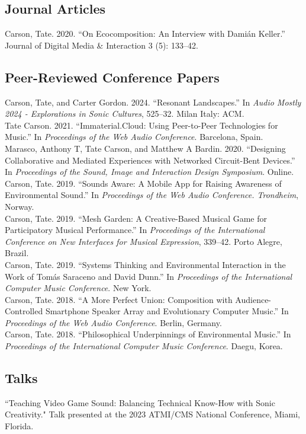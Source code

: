 \documentclass[12pt, a4paper]{article}
\newcommand{\years}[1]{\marginnote{\scriptsize #1}}
\begin{document}
\subsection*{Journal Articles}
\noindent
\years{2020} Carson, Tate. 2020. “On Ecocomposition: An Interview with Damián Keller.” Journal of Digital Media \& Interaction 3 (5): 133–42.\\


\subsection*{Peer-Reviewed Conference Papers}
\years{2024} Carson, Tate, and Carter Gordon. 2024. “Resonant Landscapes.” In \textit{Audio Mostly 2024 - Explorations in Sonic Cultures}, 525–32. Milan Italy: ACM.\\
\years{2021} Tate Carson. 2021. “Immaterial.Cloud: Using Peer-to-Peer Technologies for Music.” In \textit{Proceedings of the Web Audio Conference}. Barcelona, Spain. \\ 
\years{2020} Marasco, Anthony T, Tate Carson, and Matthew A Bardin. 2020. “Designing Collaborative and Mediated Experiences with Networked Circuit-Bent Devices.” In \textit{Proceedings of the Sound, Image and Interaction Design Symposium}. Online.\\
\years{2019} Carson, Tate. 2019. “Sounds Aware: A Mobile App for Raising Awareness of Environmental Sound.” In \textit{Proceedings of the Web Audio Conference. Trondheim}, Norway.\\
Carson, Tate. 2019. “Mesh Garden: A Creative-Based Musical Game for Participatory Musical Performance.” In \textit{Proceedings of the International Conference on New Interfaces for Musical Expression}, 339–42. Porto Alegre, Brazil.\\
Carson, Tate. 2019. “Systems Thinking and Environmental Interaction in the Work of Tomás Saraceno and David Dunn.” In \textit{Proceedings of the International Computer Music Conference}. New York.
\\
\years{2018} Carson, Tate. 2018. “A More Perfect Union: Composition with Audience-Controlled Smartphone Speaker Array and Evolutionary Computer Music.” In \textit{Proceedings of the Web Audio Conference}. Berlin, Germany.\\
Carson, Tate. 2018. “Philosophical Underpinnings of Environmental Music.” In \textit{Proceedings of the International Computer Music Conference}. Daegu, Korea.



\subsection*{Talks}
\years{2023} ``Teaching Video Game Sound: Balancing Technical Know-How with Sonic Creativity." Talk presented at the 2023 ATMI/CMS National Conference, Miami, Florida.
\end{document}
